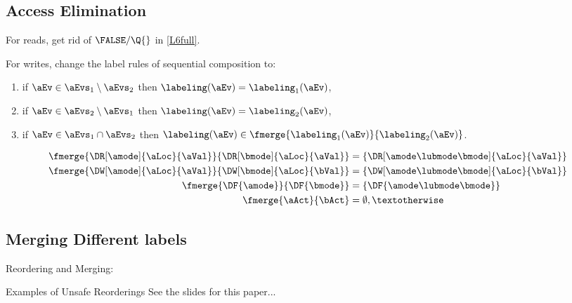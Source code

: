 \subsection{Access Elimination}
For reads, get rid of $\FALSE/\Q{}$ in \ref{L6full}.

For writes, change the label rules of sequential composition to:
\begin{enumerate}
\item %
  if $\aEv\in\aEvs_1\setminus\aEvs_2$ then $\labeling(\aEv) = \labeling_1(\aEv)$, 
\item %
  if $\aEv\in\aEvs_2\setminus\aEvs_1$ then $\labeling(\aEv) = \labeling_2(\aEv)$,
\item %
  if $\aEv\in\aEvs_1\cap\aEvs_2$ then $\labeling(\aEv) \in \fmerge{\labeling_1(\aEv)}{\labeling_2(\aEv)}$.
\end{enumerate}

\begin{definition}
  \noindent    
  \begin{align*}
    \fmerge{\DR[\amode]{\aLoc}{\aVal}}{\DR[\bmode]{\aLoc}{\aVal}} &= \{ \DR[\amode\lubmode\bmode]{\aLoc}{\aVal} \}
    \\
    \fmerge{\DW[\amode]{\aLoc}{\aVal}}{\DW[\bmode]{\aLoc}{\bVal}} &= \{ \DW[\amode\lubmode\bmode]{\aLoc}{\bVal} \}
    \\
    \fmerge{\DF{\amode}}{\DF{\bmode}} &= \{ \DF{\amode\lubmode\bmode} \}
    \\
    \fmerge{\aAct}{\bAct} &= \emptyset, \textotherwise
  \end{align*}
\end{definition}  

\subsection{Merging Different labels}

Reordering and Merging:
\cite[]{Kang19}
\cite[\textsection E]{DBLP:conf/cgo/ChakrabortyV17}

Examples of Unsafe Reorderings
\cite[\textsection D]{DBLP:conf/cgo/ChakrabortyV17}
See the slides for this paper...


